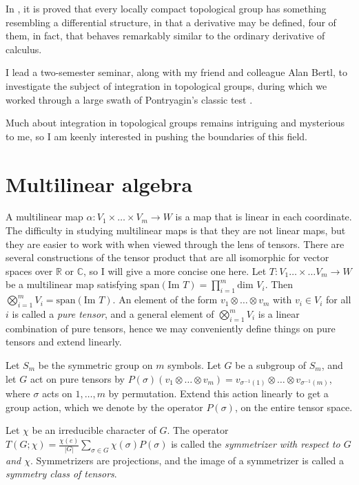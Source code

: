 \documentclass[11pt]{article}
\begin{document}
In \cite{whatever}, it is proved that every locally compact topological group
has something resembling a differential structure, in that a derivative may be
defined, four of them, in fact, that behaves remarkably similar to the ordinary
derivative of calculus. 

I lead a two-semester seminar, along with my friend and colleague Alan Bertl, to
investigate the subject of integration in topological groups, during which we
worked through a large swath of Pontryagin's classic test \cite{pon}.

Much about integration in topological groups remains intriguing and mysterious
to me, so I am keenly interested in pushing the boundaries of this field.

\section{Multilinear algebra}

A multilinear map \( \alpha: V_1 \times \dots \times V_m \to W \) is a map that
is linear in each coordinate. The difficulty in studying multilinear maps is
that they are not linear maps, but they are easier to work with when viewed
through the lens of tensors. There are several constructions of the tensor
product that are all isomorphic for vector spaces over \( \mathbb{R} \) or \(
\mathbb{C} \), so I will give a more concise one here. Let \( T: V_1 \dots
\times \dots V_m \to W \) be a multilinear map satisfying \(
\text{span}(\text{Im } T) = \prod_{i=1}^m\text{dim } V_i \). Then \(
\bigotimes_{i=1}^m V_i = \text{span}(\text{Im } T) \). An element of the form \(
v_1 \otimes \dots \otimes v_m \) with \( v_i \in V_i \) for all $i$ is called a
\emph{pure tensor}, and a general element of \( \bigotimes_{i=1}^m V_i \) is a
linear combination of pure tensors, hence we may conveniently define things on
pure tensors and extend linearly.

Let \( S_m \)
be the symmetric group on $m$ symbols. Let $G$ be a subgroup of \( S_m \),
and let $G$ act on pure tensors by
\( P(\sigma)(v_1 \otimes \dots \otimes v_m) = v_{\sigma^{-1}(1)} \otimes \dots
\otimes v_{\sigma^{-1}(m)} \),
where \( \sigma \)
acts on \( 1, \dots, m \)
by permutation. Extend this action linearly to get a group action, which we
denote by the operator \( P(\sigma) \), on the entire tensor space.

Let \( \chi \) be an irreducible character of $G$. The operator \( T(G;\chi) =
\frac{\chi(e)}{|G|}\sum_{\sigma\in G}\chi(\sigma)P(\sigma) \) is called the
\emph{symmetrizer with respect to $G$ and \( \chi \)}. Symmetrizers are
projections, and the image of a symmetrizer is called a \emph{symmetry class of
tensors}.
\end{document}
